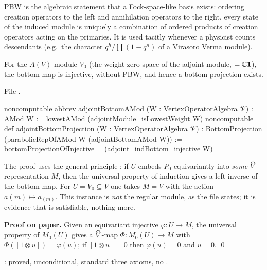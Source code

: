 \begin{physics}
PBW is the algebraic statement that a Fock-space-like basis exists: ordering creation operators to the left and
annihilation operators to the right, every state of the induced module is uniquely a combination of ordered products of
creation operators acting on the primaries. It is used tacitly whenever a physicist counts descendants (e.g.\ the character
$q^h/\prod(1-q^n)$ of a Virasoro Verma module).
\end{physics}

\begin{theorem}\label{l13:thm:adjoint}
For the $A(V)$-module $V_0$ (the weight-zero space of the adjoint module, $={\mathbb{C}}\mathbf{1}$), the bottom map is injective,
without PBW, and hence a bottom projection exists.
\end{theorem}
\noindent File .
\begin{leancode}
noncomputable abbrev adjointBottomAMod (W : VertexOperatorAlgebra 𝒱) : AMod W :=
  lowestAMod (adjointModule_isLowestWeight W)
noncomputable def adjointBottomProjection (W : VertexOperatorAlgebra 𝒱) :
    BottomProjection (parabolicRepOfAMod W (adjointBottomAMod W)) :=
  bottomProjectionOfInjective _ (adjoint_indBottom_injective W)
\end{leancode}

\begin{dictionary}
The proof uses the general principle : if $U$ embeds $P_0$-equivariantly
into \emph{some} $\widehat{V}$-representation $M$, then the universal property of induction gives a left inverse of the
bottom map. For $U = V_0\subseteq V$ one takes $M = V$ with the action $a(m)\mapsto a_{(m)}$. This instance is \emph{not}
the regular module, as the file states; it is evidence that  is satisfiable, nothing more.
\end{dictionary}

\textbf{Proof on paper.} Given an equivariant injective $\varphi:U\to M$, the universal property of $M_0(U)$ gives a
$\widehat{V}$-map $\Phi:M_0(U)\to M$ with $\Phi([1\otimes u]) = \varphi(u)$; if $[1\otimes u] = 0$ then $\varphi(u) = 0$
and $u = 0$. \qed

\begin{status}
: proved, unconditional, standard three axioms, no .
\end{status}

